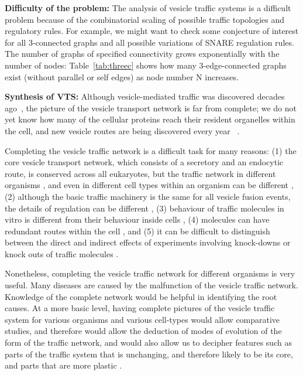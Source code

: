 \textbf{Difficulty of the problem:}
The analysis of vesicle traffic systems is a difficult problem
because of the combinatorial scaling of possible traffic topologies and regulatory rules. 
%
For example, we might want to check some conjecture of interest for all 3-connected graphs and
all possible variations of SNARE regulation rules. 
%
The number of graphs of specified connectivity grows exponentially with the number of nodes: Table~\ref{tab:threec} shows how many 3-edge-connected graphs~\cite{a052448-oeis} exist (without parallel or self edges) as node number N increases.

\textbf{Synthesis of VTS:}
Although vesicle-mediated traffic was discovered decades ago~\cite{wells2005discovery}, the picture of the vesicle transport network is far from complete; we do not yet know how many of the cellular proteins reach their resident organelles within the cell, and new vesicle routes are being discovered every year ~\cite{nickel2018unconventional,weill2018toolbox}. 

Completing the vesicle traffic network is a difficult task for many reasons: (1) the core vesicle transport network, which consists of a secretory and an endocytic route, is conserved across all eukaryotes, but the traffic network in different organisms \cite{richardson2015evolutionary,nishimoto2009differential,barlow2017seeing}, and even in different cell types within an organism can be different \cite{stoops2014trafficking,zhou2015arp2}, (2) although the basic traffic machinery is the same for all vesicle fusion events, the details of regulation can be different \cite{davletov2007regulation,di2010calcium}, (3) behaviour of traffic molecules in vitro is different from their behaviour inside cells \cite{furukawa2014multiple}, (4) molecules can have redundant routes within the cell \cite{shimizu2014compensatory,nakatsukasa2014nutrient}, and (5) it can be difficult to distinguish between the direct and indirect effects of experiments involving knock-downs or knock outs of traffic molecules \cite{hirst2004epsinr,mishev2013small}.

Nonetheless, completing the vesicle traffic network for different organisms is very useful. Many diseases are caused by the malfunction of the vesicle traffic network. Knowledge of the complete network would be helpful in identifying the root causes\cite{bexiga2013human,gissen2007cargos}. At a more basic level, having complete pictures of the vesicle traffic system for various organisms and various cell-types would allow comparative studies, and therefore would allow the deduction of modes of evolution of the form of the traffic network, and would also allow us to decipher features such as parts of the traffic system that is unchanging, and therefore likely to be its core, and parts that are more plastic \cite{barlow2017seeing}.

